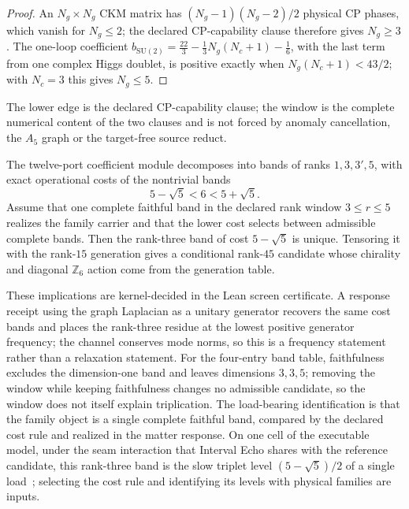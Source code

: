 \documentclass[11pt]{article}
\begin{document}
\begin{proof}
An \(N_g\times N_g\) CKM matrix has \((N_g-1)(N_g-2)/2\) physical CP phases,
which vanish for \(N_g\le2\); the declared CP-capability clause therefore gives
\(N_g\ge3\). The one-loop coefficient
\(b_{\mathrm{SU}(2)}=\tfrac{22}{3}-\tfrac13N_g(N_c+1)-\tfrac16\), with the last
term from one complex Higgs doublet, is positive exactly when
\(N_g(N_c+1)<43/2\); with \(N_c=3\) this gives \(N_g\le5\).
\end{proof}

The lower edge is the declared CP-capability clause; the window is the
complete numerical content of the two clauses and is not forced by anomaly
cancellation, the \(A_5\) graph or the target-free source reduct.

\begin{proposition}
\label{prop:band-selection}
The twelve-port coefficient module decomposes into bands of ranks
\(1,3,3',5\), with exact operational costs of the nontrivial bands
\[
5-\sqrt5<6<5+\sqrt5.
\]
Assume that one complete faithful band in the declared rank window
\(3\le r\le5\) realizes the family carrier and that the lower cost selects
between admissible complete bands. Then the rank-three band of cost
\(5-\sqrt5\) is unique. Tensoring it with the rank-\(15\) generation gives a
conditional rank-\(45\) candidate whose chirality and diagonal \(\mathbb Z_6\)
action come from the generation table.
\end{proposition}

These implications are kernel-decided in the Lean screen certificate. A
response receipt using the graph Laplacian as a unitary generator recovers
the same cost bands and places the rank-three residue at the lowest positive
generator frequency; the channel conserves mode norms, so this is a
frequency statement rather than a relaxation statement. For the four-entry
band table, faithfulness excludes the dimension-one band and leaves
dimensions \(3,3,5\); removing the window while keeping faithfulness changes no
admissible candidate, so the window does not itself explain triplication. The
load-bearing identification is that the family object is a single complete
faithful band, compared by the declared cost rule and realized in the matter
response. On one cell of the executable model, under the seam interaction
that Interval Echo shares with the reference candidate, this rank-three band
is the slow triplet level \((5-\sqrt5)/2\) of a single load~\cite{ophmodel};
selecting the
cost rule and identifying its levels with physical families are inputs.
\end{document}
